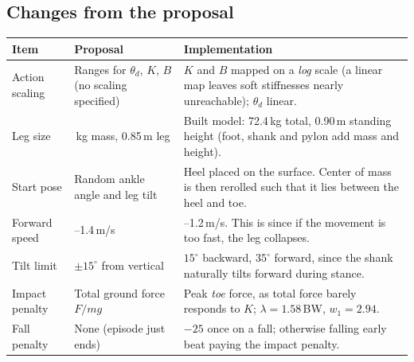 \documentclass[10pt,a4paper]{article}
\begin{document}
\subsection{Changes from the proposal}
\begin{center}\small
\begin{tabular}{@{}l >{\raggedright\arraybackslash}p{2.3in} >{\raggedright\arraybackslash}p{3.3in}@{}}
\toprule
Item & Proposal & Implementation \\
\midrule
Action scaling & Ranges for $\theta_d$, $K$, $B$ (no scaling specified) & $K$ and $B$ mapped on a \emph{log} scale (a linear map leaves soft stiffnesses nearly unreachable); $\theta_d$ linear. \\
Leg size & 70\,kg mass, 0.85\,m leg & Built model: 72.4\,kg total, 0.90\,m standing height (foot, shank and pylon add mass and height). \\
Start pose & Random ankle angle and leg tilt & Heel placed on the surface. Center of mass is then rerolled such that it lies between the heel and toe. \\
Forward speed & 0.8--1.4\,m/s & 0.8--1.2\,m/s. This is since if the movement is too fast, the leg collapses. \\
Tilt limit & $\pm15^\circ$ from vertical & $15^\circ$ backward, $35^\circ$ forward, since the shank naturally tilts forward during stance. \\
Impact penalty & Total ground force $F/mg$ & Peak \emph{toe} force, as total force barely responds to $K$; $\lambda = 1.58$\,BW, $w_1 = 2.94$. \\
Fall penalty & None (episode just ends) & $-25$ once on a fall; otherwise falling early beat paying the impact penalty. \\
\bottomrule
\end{tabular}
\end{center}
\end{document}
